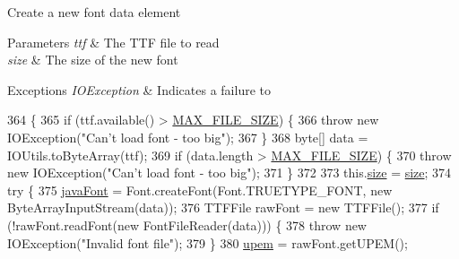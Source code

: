 Create a new font data element


\begin{DoxyParams}{Parameters}
{\em ttf} & The T\+TF file to read \\
\hline
{\em size} & The size of the new font \\
\hline
\end{DoxyParams}

\begin{DoxyExceptions}{Exceptions}
{\em I\+O\+Exception} & Indicates a failure to \\
\hline
\end{DoxyExceptions}

\begin{DoxyCode}
364                                                                      \{
365         \textcolor{keywordflow}{if} (ttf.available() > \mbox{\hyperlink{classorg_1_1newdawn_1_1slick_1_1tools_1_1hiero_1_1truetype_1_1_font_data_a35896aef6b3483a95e0b8e4ef5a5140f}{MAX\_FILE\_SIZE}}) \{
366             \textcolor{keywordflow}{throw} \textcolor{keyword}{new} IOException(\textcolor{stringliteral}{"Can't load font - too big"});
367         \}
368         byte[] data = IOUtils.toByteArray(ttf);
369         \textcolor{keywordflow}{if} (data.length > \mbox{\hyperlink{classorg_1_1newdawn_1_1slick_1_1tools_1_1hiero_1_1truetype_1_1_font_data_a35896aef6b3483a95e0b8e4ef5a5140f}{MAX\_FILE\_SIZE}}) \{
370             \textcolor{keywordflow}{throw} \textcolor{keyword}{new} IOException(\textcolor{stringliteral}{"Can't load font - too big"});
371         \}
372         
373         this.\mbox{\hyperlink{classorg_1_1newdawn_1_1slick_1_1tools_1_1hiero_1_1truetype_1_1_font_data_a96af538e2a7368fdba46ffc2ad6a9a0e}{size}} = \mbox{\hyperlink{classorg_1_1newdawn_1_1slick_1_1tools_1_1hiero_1_1truetype_1_1_font_data_a96af538e2a7368fdba46ffc2ad6a9a0e}{size}};
374         \textcolor{keywordflow}{try} \{
375             \mbox{\hyperlink{classorg_1_1newdawn_1_1slick_1_1tools_1_1hiero_1_1truetype_1_1_font_data_ab48e0ef57ae93083499407b9998d93a6}{javaFont}} = Font.createFont(Font.TRUETYPE\_FONT, \textcolor{keyword}{new} ByteArrayInputStream(data));
376             TTFFile rawFont = \textcolor{keyword}{new} TTFFile();
377             \textcolor{keywordflow}{if} (!rawFont.readFont(\textcolor{keyword}{new} FontFileReader(data))) \{
378                 \textcolor{keywordflow}{throw} \textcolor{keyword}{new} IOException(\textcolor{stringliteral}{"Invalid font file"});
379             \}
380             \mbox{\hyperlink{classorg_1_1newdawn_1_1slick_1_1tools_1_1hiero_1_1truetype_1_1_font_data_ab589aa26cfcd58d7e7f8ffa3c68800a5}{upem}} = rawFont.getUPEM();

\end{DoxyCode}
